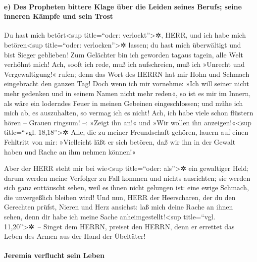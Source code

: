 \hypertarget{e-des-propheten-bittere-klage-uxfcber-die-leiden-seines-berufs-seine-inneren-kuxe4mpfe-und-sein-trost}{%
\paragraph{e) Des Propheten bittere Klage über die Leiden seines Berufs;
seine inneren Kämpfe und sein
Trost}\label{e-des-propheten-bittere-klage-uxfcber-die-leiden-seines-berufs-seine-inneren-kuxe4mpfe-und-sein-trost}}

Du hast mich betört\textless sup title=``oder:
verlockt''\textgreater✲, HERR, und ich habe mich betören\textless sup
title=``oder: verlocken''\textgreater✲ lassen; du hast mich überwältigt
und bist Sieger geblieben! Zum Gelächter bin ich geworden tagaus tagein,
alle Welt verhöhnt mich! Ach, sooft ich rede, muß ich
aufschreien, muß ich »Unrecht und Vergewaltigung!« rufen; denn das Wort
des HERRN hat mir Hohn und Schmach eingebracht den ganzen Tag!
Doch wenn ich mir vornehme: »Ich will seiner nicht mehr
gedenken und in seinem Namen nicht mehr reden«, so ist es mir im Innern,
als wäre ein loderndes Feuer in meinen Gebeinen eingeschlossen; und mühe
ich mich ab, es auszuhalten, so vermag ich es nicht! Ach,
ich habe viele schon flüstern hören -- Grauen ringsum! --: »Zeigt ihn
an!« und »Wir wollen ihn anzeigen!«\textless sup title=``vgl.
18,18''\textgreater✲ Alle, die zu meiner Freundschaft gehören, lauern
auf einen Fehltritt von mir: »Vielleicht läßt er sich betören, daß wir
ihn in der Gewalt haben und Rache an ihm nehmen können!«

Aber der HERR steht mir bei wie\textless sup
title=``oder: als''\textgreater✲ ein gewaltiger Held; darum werden meine
Verfolger zu Fall kommen und nichts ausrichten; sie werden sich ganz
enttäuscht sehen, weil es ihnen nicht gelungen ist: eine ewige Schmach,
die unvergeßlich bleiben wird! Und nun, HERR der
Heerscharen, der du den Gerechten prüfst, Nieren und Herz ansiehst: laß
mich deine Rache an ihnen sehen, denn dir habe ich meine Sache
anheimgestellt!\textless sup title=``vgl. 11,20''\textgreater✲~--
Singet dem HERRN, preiset den HERRN, denn er errettet das
Leben des Armen aus der Hand der Übeltäter!

\hypertarget{jeremia-verflucht-sein-leben}{%
\paragraph{Jeremia verflucht sein
Leben}\label{jeremia-verflucht-sein-leben}}

